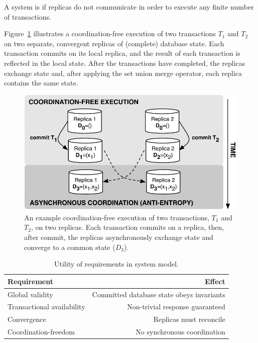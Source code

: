 \begin{definition}
A system is \textit{\cfree} if replicas do not communicate in order to
execute any finite number of transactions.
\end{definition}

Figure~\ref{fig:replicas} illustrates a coordination-free execution of
two transactions $T_1$ and $T_2$ on two separate, convergent replicas
of (complete) database state. Each transaction commits on its local
replica, and the result of each transaction is reflected in the local
state. After the transactions have completed, the replicas exchange
state and, after applying the set union merge operator, each replica
contains the same state.

\begin{figure}
\begin{center}
\includegraphics[width=.85\columnwidth]{figs/replicas.pdf}
\end{center}\vspace{-1em}
\caption{An example coordination-free execution of two transactions,
  $T_1$ and $T_2$, on two replicas. Each transaction commits
  on a replica, then, after commit, the replicas asynchronously
  exchange state and converge to a common state ($D_3$).}
\label{fig:replicas}
\end{figure}


\begin{table}
\begin{center}
\small
\begin{tabular}{|l|r|}
\hline\textbf{Requirement} & \textbf{Effect}  \\\hline
Global validity & Committed database state obeys invariants  \\
Transactional availability & Non-trivial response guaranteed \\
Convergence & Replicas must reconcile \\
Coordination-freedom & No synchronous coordination\\\hline
\end{tabular}
\end{center}\vspace{-1em}
\caption{Utility of requirements in system model.}
\label{table:requirements}
\end{table}


